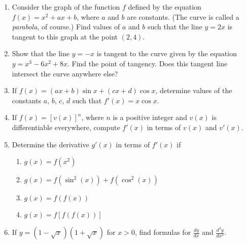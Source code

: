 \documentclass[11pt]{article}
\begin{document}
\begin{enumerate}
\item Consider the graph of the function $f$ defined by the equation
  $f(x) = x^2 + ax + b$, where $a$ and $b$ are constants.  (The curve
  is called a \emph{parabola}, of course.)  Find values of $a$ and $b$
  such that the line $y=2x$ is tangent to this graph at the point
  $(2,4)$.


\item Show that the line $y=-x$ is tangent to the curve given by the
  equation $y=x^3-6x^2+8x$.  Find the point of tangency.  Does this
  tangent line intersect the curve anywhere else?


\item If $f(x) = (ax+b)\sin x + (cx+d)\cos x$, determine values of the
  constants $a$, $b$, $c$, $d$ such that $f'(x) = x\cos x$.


\item If $f(x) = \left[v(x)\right]^n$, where $n$ is a positive integer
  and $v(x)$ is differentiable everywhere, compute $f'(x)$ in terms of
  $v(x)$ and $v'(x)$.


\item Determine the derivative $g'(x)$ in terms of $f'(x)$ if
  \begin{enumerate}
  \item $g(x) = f\left(x^2\right)$
  \item $g(x) = f\left(\sin^2(x)\right) + f\left(\cos^2(x)\right)$
  \item $g(x) = f\left(f(x)\right)$
  \item $g(x) = f\left[f\left(f(x)\right)\right]$
  \end{enumerate}


\item If $y = \left(1-\sqrt{x}\right)\left(1+\sqrt{x}\right)$ for
  $x>0$, find formulas for $\frac{dy}{dx}$ and $\frac{d^2y}{dx^2}$.



\end{enumerate}
\end{document}
